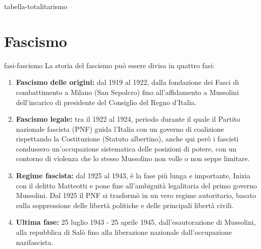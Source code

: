 \documentclass[preview]{standalone}
\begin{document}
\begin{snippet}{tabella-totalitarismo}
\begin{table}[htbp]
    \end{table}
    \vspace{0.25cm}
\end{snippet}

\section{Fascismo}

\begin{snippet}{fasi-fascismo}
    La storia del fascismo può essere divisa in quattro fasi:
    \begin{enumerate}
        \item \textbf{Fascismo delle origini:} dal 1919 al 1922, dalla fondazione dei Fasci di combattimento a Milano (San
        Sepolcro) fino all'affidamento a Mussolini dell'incarico di presidente del Consiglio del Regno d'Italia.
        \item \textbf{Fascismo legale:} tra il 1922 al 1924, periodo durante il quale il Partito nazionale fascista (PNF) guida l'Italia
        con un governo di coalizione rispettando la Costituzione (Statuto albertino), anche qui però i fascisti
        condussero un'occupazione sistematica delle posizioni di potere, con un contorno di violenza che lo stesso
        Mussolino non volle o non seppe limitare.
        \item \textbf{Regime fascista:} dal 1925 al 1943, è la fase più lunga e importante, Inizia con il delitto Matteotti e pone
        fine all'ambiguità legalitaria del primo governo Mussolini. Dal 1925 il PNF si trasformò in un vero regime
        autoritario, basato sulla soppressione delle libertà politiche e delle principali libertà civili.
        \item \textbf{Ultima fase:} 25 luglio 1943 - 25 aprile 1945, dall'esautorazione di Mussolini, alla repubblica di Salò fino alla
        liberazione nazionale dall'occupazione nazifascista.
    \end{enumerate}
\end{snippet}
\end{document}

